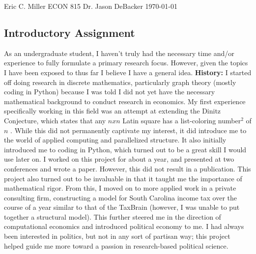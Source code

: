 \documentclass[12pt]{article}
\begin{document}
\noindent Eric C. Miller\newline\newline
ECON 815\newline\newline
Dr. Jason DeBacker\newline\newline
\today \newline

\begin{center}
\section*{Introductory Assignment}
\end{center}

\noindent As an undergraduate student, I haven't truly had the necessary time and/or experience to fully formulate a primary research focus. However, given the topics I have been exposed to thus far I believe I have a general idea. 
\newline
\newline
\textbf{History:} 
\newline\newline
I started off doing research in discrete mathematics, particularly graph theory (mostly coding in Python) because I was told I did not yet have the necessary mathematical background to conduct research in economics. My first experience specifically working in this field was an attempt at extending the Dinitz Conjecture, which states that any $nxn$ Latin square has a list-coloring number$^2$ of $n$ \cite{ref1:1}. While this did not permanently captivate my interest, it did introduce me to the world of applied computing and parallelized structure. It also initially introduced me to coding in Python, which turned out to be a great skill I would use later on. I worked on this project for about a year, and presented at two conferences and wrote a paper. However, this did not result in a publication. This project also turned out to be invaluable in that it taught me the importance of mathematical rigor.
\newline\newline
From this, I moved on to more applied work in a private consulting firm, constructing a model for South Carolina income tax over the course of a year similar to that of the TaxBrain (however, I was unable to put together a structural model). This further steered me in the direction of computational economics and introduced political economy to me. I had always been interested in politics, but not in any sort of partisan way; this project helped guide me more toward a passion in research-based political science.
\end{document}
